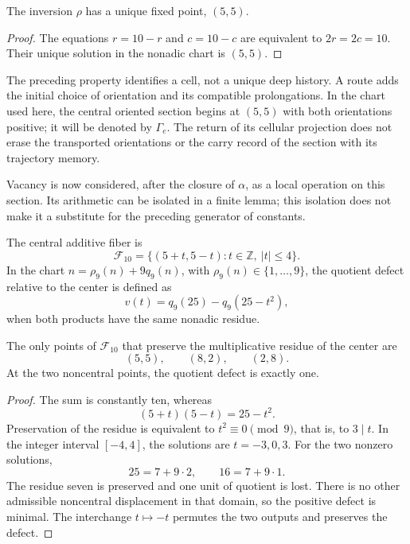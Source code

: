 \begin{proposition}
The inversion \(\rho\) has a unique fixed point, \((5,5)\).
\end{proposition}
\begin{proof}
The equations \(r=10-r\) and \(c=10-c\) are equivalent to
\(2r=2c=10\). Their unique solution in the nonadic chart is \((5,5)\).
\end{proof}

The preceding property identifies a cell, not a unique deep
history. A route adds the initial choice of orientation and its
compatible prolongations. In the chart used here, the central
oriented section begins at \((5,5)\) with both orientations
positive; it will be denoted by \(\Gamma_e\). The return of its cellular
projection does not erase the transported orientations or the carry
record of the section with its trajectory memory.

Vacancy is now considered, after the closure of \(\alpha\), as
a local operation on this section. Its arithmetic can be isolated in a
finite lemma; this isolation does not make it a substitute for the
preceding generator of constants.

\begin{definition}
The central additive fiber is
\[
 \mathcal F_{10}
 =\{(5+t,5-t):t\in\mathbb Z,\ |t|\leq4\}.
\]
In the chart \(n=\rho_9(n)+9q_9(n)\), with
\(\rho_9(n)\in\{1,\ldots,9\}\), the quotient defect relative
to the center is defined as
\[
 v(t)=q_9(25)-q_9(25-t^2),
\]
when both products have the same nonadic residue.
\end{definition}

\begin{lemma}
The only points of \(\mathcal F_{10}\) that preserve the
multiplicative residue of the center are
\[
 (5,5),\qquad (8,2),\qquad (2,8).
\]
At the two noncentral points, the quotient defect is exactly one.
\end{lemma}
\begin{proof}
The sum is constantly ten, whereas
\[
 (5+t)(5-t)=25-t^2.
\]
Preservation of the residue is equivalent to \(t^2\equiv0\pmod9\), that is,
to \(3\mid t\). In the integer interval \([-4,4]\), the solutions are
\(t=-3,0,3\). For the two nonzero solutions,
\[
 25=7+9\cdot2,\qquad16=7+9\cdot1.
\]
The residue seven is preserved and one unit of quotient is lost. There is
no other admissible noncentral displacement in that domain, so the
positive defect is minimal. The interchange \(t\mapsto-t\) permutes the
two outputs and preserves the defect.
\end{proof}

